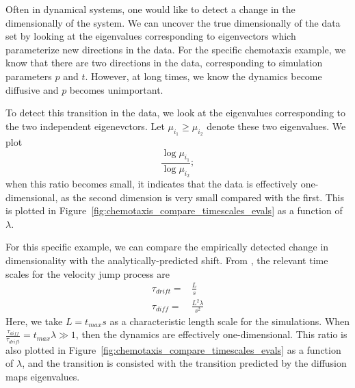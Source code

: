 \documentclass[preprint]{elsarticle}
\begin{document}
Often in dynamical systems, one would like to detect a change in the dimensionally of the system. 
%
We can uncover the true dimensionally of the data set by looking at the eigenvalues corresponding to eigenvectors which parameterize new directions in the data. 
%
For the specific chemotaxis example, we know that there are two directions in the data, corresponding to simulation parameters $p$ and $t$. 
%
However, at long times, we know the dynamics become diffusive and $p$ becomes unimportant. 

To detect this transition in the data, we look at the eigenvalues corresponding to the two independent eigenevctors. 
%
Let $\mu_{i_1} \ge \mu_{i_2}$ denote these two eigenvalues. 
%
We plot  
\begin{equation}
 \frac{\log \mu_{i_1}}{\log \mu_{i_2}} ;
\end{equation}
when this ratio becomes small, it indicates that the data is effectively one-dimensional, as the second dimension is very small compared with the first. 
%
This is plotted in Figure~\ref{fig:chemotaxis_compare_timescales_evals} as a function of $\lambda$. 

For this specific example, we can compare the empirically detected change in dimensionality with the analytically-predicted shift. 
%
From \cite{...}, the relevant time scales for the velocity jump process are
\begin{equation}
\begin{aligned}
\tau_{drift} =& \frac{L}{s} \\
\tau_{diff} =& \frac{L^2 \lambda}{s^2}
\end{aligned}
\end{equation}
%
Here, we take $L = t_{max} s$ as a characteristic length scale for the simulations. 
%
When $\frac{\tau_{diff}}{\tau_{drift}} =  t_{max}  \lambda \gg 1$, then the dynamics are effectively one-dimensional. 
%
This ratio is also plotted in Figure~\ref{fig:chemotaxis_compare_timescales_evals} as a function of $\lambda$, and the transition is consisted with the transition predicted by the diffusion maps eigenvalues. 
\end{document}
